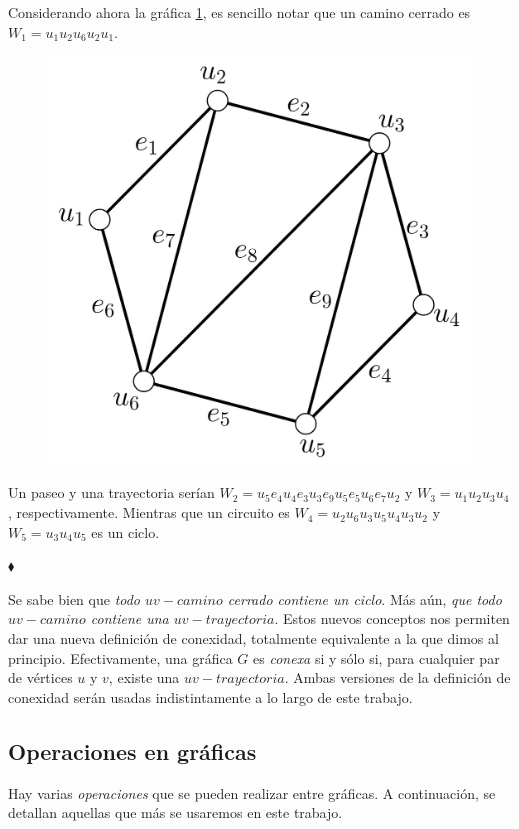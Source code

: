 \begin{ejem}
Considerando ahora la gráfica \ref{fig:GrafoCaminos2}, es sencillo notar que un camino cerrado es $W_{1}=u_{1}u_{2}u_{6}u_{2}u_{1}$. 
 \begin{figure}[H]
    \centering
    \includegraphics[scale=0.22]{img/imgchapter1/GrafoCaminos2.jpg}
    \caption{}
    \label{fig:GrafoCaminos2}
\end{figure}
Un paseo y una trayectoria serían $W_{2}=u_{5}e_{4}u_{4}e_{3}u_{3}e_{9}u_{5}e_{5}u_{6}e_{7}u_{2}$ y $W_{3} = u_{1}u_{2}u_{3}u_{4}$, respectivamente. Mientras que un circuito es $W_{4}=u_{2}u_{6}u_{3}u_{5}u_{4}u_{3}u_{2}$ y $W_{5}=u_{3}u_{4}u_{5}$ es un ciclo.

\hfill $\blacklozenge$
\end{ejem}

Se sabe bien que \textit{todo $uv-camino$ cerrado contiene un ciclo}. Más aún, \textit{que todo $uv-camino$ contiene una $uv-trayectoria$}. Estos nuevos conceptos nos permiten dar una nueva definición de conexidad, totalmente equivalente a la que dimos al principio. Efectivamente, una gráfica $G$ es \textit{conexa} si y sólo si, para cualquier par de vértices $u$ y $v$, existe una $uv-trayectoria$. Ambas versiones de la definición de conexidad serán usadas indistintamente a lo largo de este trabajo.

\subsection{Operaciones en gráficas}
Hay varias \textit{operaciones} que se pueden realizar entre gráficas. A continuación, se detallan aquellas que más se usaremos en este trabajo.

